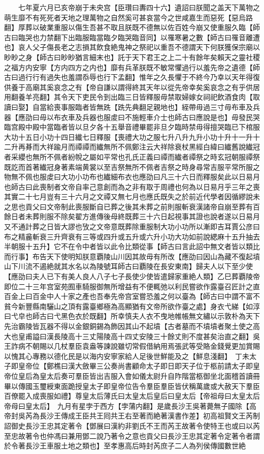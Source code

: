 　　七年夏六月已亥帝崩于未央宫【臣瓚曰夀四十六】遺詔曰朕聞之盖天下萬物之萌生靡不有死死者天地之理萬物之自然奚可甚哀當今之世咸嘉生而惡死【惡烏路翻】厚葬以破業重服以傷生吾甚不取且朕既不德無以佐百姓今崩又使重服久臨【師古曰臨哭也力禁翻下出臨服臨當臨夕臨哭臨音同】以罹寒暑之數【師古曰罹音離遭也】哀人父子傷長老之志損其飲食絶鬼神之祭祀以重吾不德謂天下何朕獲保宗廟以眇眇之身【師古曰眇眇猶言細末也】託于天下君王之上二十有餘年矣賴天之靈社稷之福方内安寧【方内四方之内也】靡有兵革朕既不敏常懼過行以羞先帝之遺德【師古曰過行行有過失也羞謂忝辱也行下孟翻】惟年之久長懼于不終今乃幸以天年得復供養于高廟其奚哀念之有【帝自謙以謂得終其天年以從先帝幸矣奚哀念之有乎供居用翻養羊亮翻】其令天下吏民令到出臨三日皆釋服毋禁取婦嫁女祠祀飲酒食肉【取讀曰娶】自當給喪事服臨者皆無跣【跣先典翻足親地也】絰帶毋過三寸毋布車及兵器【應劭曰毋以布衣車及兵器也服䖍曰不施輕車介士也師古曰應說是也】毋發民哭臨宫殿中殿中當臨者皆以旦夕各十五舉音禮畢罷非旦夕臨時禁毋得擅哭臨已下棺服大功十五日小功十四日纎七日釋服【喪禮大功之服七升八升九升小功十升十一升十二升再朞而大祥踰月而禫禫而纎無所不佩鄭注云大祥除衰杖黑經白緯曰纎舊說纎冠者采纓也無所不佩者紛帨之屬如平常也孔氏正義曰禫而纎者禫祭之時玄冠朝服禫祭既訖而首著纎冠身著素端黄裳以至吉祭無所不佩者吉祭之時身尋常吉服平常所服之物無不佩也服䖍曰大功小功布也纎細布衣也應劭曰凡三十六日而釋服矣此以日易月也師古曰此喪制者文帝自率己意創而為之非有取于周禮也何為以日易月乎三年之喪其實二十七月豈有三十六月之文禫又無七月也應氏既失之於前近代學者因循繆說未之思也貢父曰文帝制此喪服斷自已葬之後其未葬之前則服斬衰漢諸帝自崩至葬有百餘日者未葬則服不除矣翟方進傳後母終既葬三十六日起視事其證也說者遂以日易月又不通計葬之日皆大謬也攷之文帝意既葬除重服制大功小功所以漸即吉耳賈公彦曰布之精麄斬衰三升齊衰有三等或四升或五升或六升小功大功如前說緦麻十五升抽去半朝服十五升】它不在令中者皆以此令比類從事【師古曰言此詔中無文者皆以類比而行事】布告天下使明知朕意覇陵山川因其故毋有所改【應劭曰因山為藏不復起墳山下川流不遏絶就其水名以為陵號耳師古曰覇陵在長安東南】歸夫人以下至少使【應劭曰夫人已下有美人良人八子七子長使少使皆遣歸家重絶人類】乙巳葬覇陵帝即位二十三年宫室苑囿車騎服御無所增益有不便輒弛以利民嘗欲作露臺召匠計之直百金上曰百金中人十家之產也吾奉先帝宫室嘗恐羞之何以臺為【師古曰中謂不富不貧今新豐縣南驪山之頂有露臺鄉極為高顯猶有文帝所欲作臺之處】身衣弋綈【如淳曰弋皁也師古曰弋黑色衣於既翻】所幸慎夫人衣不曳地帷帳無文繡以示敦朴為天下先治霸陵皆瓦器不得以金銀銅錫為飾因其山不起墳【古者墓而不墳墳者聚土使之高大也皇甫謚曰漢長陵高十三丈陽陵高十四丈安陵三十餘丈則不度甚矣治直之翻】吳王詐病不朝賜以几杖羣臣袁盎等諫說雖切常假借納用焉張武等受賂金錢覺更加賞賜以愧其心專務以德化民是以海内安寧家給人足後世鮮能及之【鮮息淺翻】　丁未太子即皇帝位【鄭樵曰漢大斂畢三公奏尚書顧命太子即日即天子位于柩前請太子即皇帝位皇后為皇太后奏可羣臣皆出吉服入會如儀太尉升自阼階當柩御坐北面稽首讀冊畢以傳國玉璽綬東面跪授皇太子即皇帝位告令羣臣羣臣皆伏稱萬歲或大赦天下羣臣百僚罷入成喪服如禮】尊皇太后薄氏曰太皇太后皇后曰皇太后【帝祖母曰太皇太后帝母曰皇太后】　九月有星孛于西方【孛蒲内翻】是歲長沙王吳著薨無子國除【高帝封吳芮為長沙王傳成王臣共王囘共王右至著而絶著漢書作差】初高祖賢文王芮制詔御史長沙王忠其定著令【鄧展曰漢約非劉氏不王而芮王故著令使特王也或曰以芮至忠故著令也仲馮曰兼用鄧二說乃著令之意也貢父曰長沙王忠其定著令定著令者謂於令著長沙王車服土地之類也】至孝惠高后時封芮庶子二人為列侯傳國數世絶

